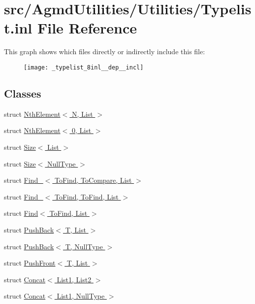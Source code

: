 \hypertarget{_typelist_8inl}{\section{src/\+Agmd\+Utilities/\+Utilities/\+Typelist.inl File Reference}
\label{_typelist_8inl}
}
This graph shows which files directly or indirectly include this file\+:\nopagebreak
\begin{figure}[H]
\begin{center}
\leavevmode
\texttt{[image: \_typelist\_8inl\_\_dep\_\_incl]}
\end{center}
\end{figure}
\subsection*{Classes}
\begin{DoxyCompactItemize}
\item 
struct \hyperlink{struct_nth_element}{Nth\+Element$<$ N, List $>$}
\item 
struct \hyperlink{struct_nth_element_3_010_00_01_list_01_4}{Nth\+Element$<$ 0, List $>$}
\item 
struct \hyperlink{struct_size}{Size$<$ List $>$}
\item 
struct \hyperlink{struct_size_3_01_null_type_01_4}{Size$<$ Null\+Type $>$}
\item 
struct \hyperlink{struct_find__}{Find\+\_\+$<$ To\+Find, To\+Compare, List $>$}
\item 
struct \hyperlink{struct_find___3_01_to_find_00_01_to_find_00_01_list_01_4}{Find\+\_\+$<$ To\+Find, To\+Find, List $>$}
\item 
struct \hyperlink{struct_find}{Find$<$ To\+Find, List $>$}
\item 
struct \hyperlink{struct_push_back}{Push\+Back$<$ T, List $>$}
\item 
struct \hyperlink{struct_push_back_3_01_t_00_01_null_type_01_4}{Push\+Back$<$ T, Null\+Type $>$}
\item 
struct \hyperlink{struct_push_front}{Push\+Front$<$ T, List $>$}
\item 
struct \hyperlink{struct_concat}{Concat$<$ List1, List2 $>$}
\item 
struct \hyperlink{struct_concat_3_01_list1_00_01_null_type_01_4}{Concat$<$ List1, Null\+Type $>$}
\end{DoxyCompactItemize}
